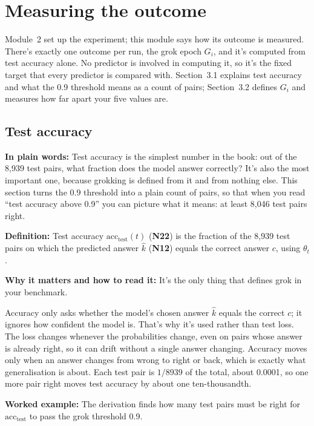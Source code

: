 \documentclass[11pt,a4paper,oneside,openany]{report}
\newcommand{\acctest}{\mathrm{acc}_{\mathrm{test}}}
\newcommand{\gl}[1]{\textbf{#1}}   %
\newcommand{\fplain}{\textbf{In plain words:} }
\newcommand{\fdef}{\textbf{Definition:} }
\newcommand{\fread}{\par\textbf{Why it matters and how to read it:} }
\newcommand{\fex}{\par\textbf{Worked example:} }
\begin{document}
\chapter{Measuring the outcome}

Module~2 set up the experiment; this module says how its outcome is measured. There's exactly one outcome per run, the grok epoch $G_i$, and it's computed from test accuracy alone. No predictor is involved in computing it, so it's the fixed target that every predictor is compared with. Section~3.1 explains test accuracy and what the 0.9 threshold means as a count of pairs; Section~3.2 defines $G_i$ and measures how far apart your five values are.

\section{Test accuracy}
\fplain Test accuracy is the simplest number in the book: out of the 8{,}939 test pairs, what fraction does the model answer correctly? It's also the most important one, because grokking is defined from it and from nothing else. This section turns the 0.9 threshold into a plain count of pairs, so that when you read ``test accuracy above 0.9'' you can picture what it means: at least 8{,}046 test pairs right.

\fdef Test accuracy $\acctest(t)$ (\gl{N22}) is the fraction of the 8{,}939 test pairs on which the predicted answer $\hat k$ (\gl{N12}) equals the correct answer $c$, using $\theta_t$.
\fread It's the only thing that defines grok in your benchmark.

Accuracy only asks whether the model's chosen answer $\hat k$ equals the correct $c$; it ignores how confident the model is. That's why it's used rather than test loss. The loss changes whenever the probabilities change, even on pairs whose answer is already right, so it can drift without a single answer changing. Accuracy moves only when an answer changes from wrong to right or back, which is exactly what generalisation is about. Each test pair is $1/8939$ of the total, about 0.0001, so one more pair right moves test accuracy by about one ten-thousandth.

\fex The derivation finds how many test pairs must be right for $\acctest$ to pass the grok threshold 0.9.
\end{document}
